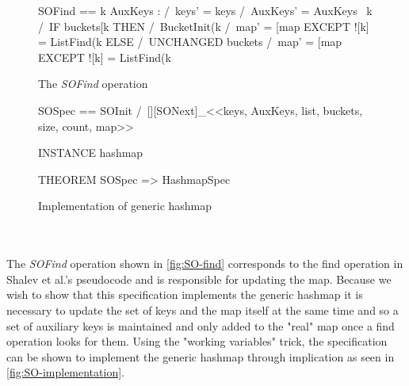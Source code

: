 \documentclass{uit-thesis}
\begin{document}
\begin{figure}
    \begin{tla}
        SOFind == \E k \in AuxKeys :
                /\ keys' = keys 
                /\ AuxKeys' = AuxKeys \ {k}
                /\ IF buckets[k %
                     THEN /\ BucketInit(k %
                          /\ map' = [map EXCEPT ![k] = ListFind(k %
                     ELSE /\ UNCHANGED buckets
                          /\ map' = [map EXCEPT ![k] = ListFind(k %

    \end{tla}
\begin{tlatex}
%
%
%
%
%
\@pvspace{8.0pt}%
\end{tlatex}
    \caption{The \textit{SOFind} operation}
    \label{fig:SO-find}
\end{figure}
\begin{figure}
    \begin{tla}
    SOSpec == SOInit /\ [][SONext]_<<keys, AuxKeys, list, buckets, size, count, map>>

    INSTANCE hashmap

    THEOREM SOSpec => HashmapSpec
    \end{tla}
\begin{tlatex}
\@pvspace{8.0pt}%
%
\@pvspace{8.0pt}%
%
\end{tlatex}
    \caption{Implementation of generic hashmap}
    \label{fig:SO-implementation}
\end{figure}
\\\\
The \textit{SOFind} operation shown in \autoref{fig:SO-find} corresponds to the find operation in Shalev et al.'s pseudocode and is responsible for updating the map. Because we wish to show that this specification implements the generic hashmap it is necessary to update the set of keys and the map itself at the same time and so a set of auxiliary keys is maintained and only added to the "real" map once a find operation looks for them. Using the "working variables" trick, the specification can be shown to implement the generic hashmap through implication as seen in \autoref{fig:SO-implementation}.
\end{document}
